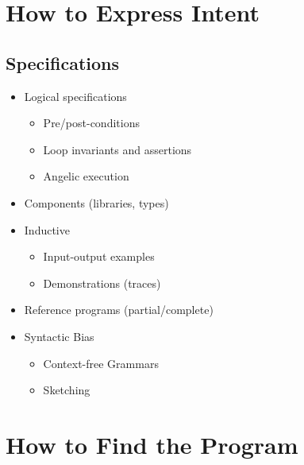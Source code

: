 \documentclass[notes=hide]{beamer}
\begin{document}

\section{How to Express Intent}

\subsection{Specifications}

\begin{frame}{\secname}{\subsecname}
  \begin{itemize}
  \item<+-> Logical specifications
    \begin{itemize}
    \item Pre/post-conditions
    \item Loop invariants and assertions
    \item Angelic execution
    \end{itemize}
  \item<+-> Components (libraries, types)
  \item<+-> Inductive
    \begin{itemize}
    \item Input-output examples   %
    \item Demonstrations (traces) %
    \end{itemize}
  \item<+-> Reference programs (partial/complete)
  \item<+-> Syntactic Bias
    \begin{itemize}
    \item Context-free Grammars
    \item Sketching
    \end{itemize}
  \end{itemize}
\end{frame}

\section{How to Find the Program}
\end{document}

